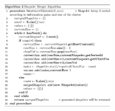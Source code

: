\documentclass[conference]{IEEEtran}  %
\begin{document}
\begin{figure}
\includegraphics[width=0.5\textwidth]{algo2.png}
\label{fig:algo2}
\end{figure}



\end{document}
